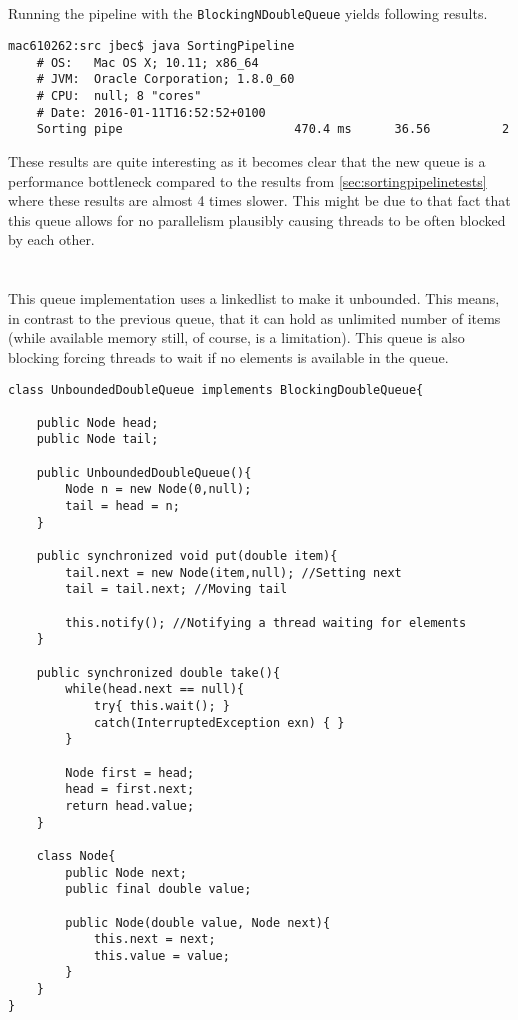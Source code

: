 \documentclass{ituhandin}
\begin{document}
\section{}
Running the pipeline with the \texttt{BlockingNDoubleQueue} yields following results.
\begin{lstlisting}[language={},frame={}]
    mac610262:src jbec$ java SortingPipeline
    # OS:   Mac OS X; 10.11; x86_64
    # JVM:  Oracle Corporation; 1.8.0_60
    # CPU:  null; 8 "cores"
    # Date: 2016-01-11T16:52:52+0100
    Sorting pipe                        470.4 ms      36.56          2
\end{lstlisting}
These results are quite interesting as it becomes clear that the new queue is a performance bottleneck compared to the results from \ref{sec:sortingpipelinetests} where these results are almost 4 times slower. This might be due to that fact that this queue allows for no parallelism plausibly causing threads to be often blocked by each other.

\chapter{} %
\section{}
This queue implementation uses a linkedlist to make it unbounded. This means, in contrast to the previous queue, that it can hold as unlimited number of items (while available memory still, of course, is a limitation). This queue is also blocking forcing threads to wait if no elements is available in the queue.
\begin{lstlisting}[caption= Implementation of the \texttt{UnboundedDoubleQueue} blocking queue]
class UnboundedDoubleQueue implements BlockingDoubleQueue{

    public Node head;
    public Node tail;

    public UnboundedDoubleQueue(){
        Node n = new Node(0,null);
        tail = head = n;
    }

    public synchronized void put(double item){
        tail.next = new Node(item,null); //Setting next
        tail = tail.next; //Moving tail

        this.notify(); //Notifying a thread waiting for elements
    }

    public synchronized double take(){
        while(head.next == null){
            try{ this.wait(); }
            catch(InterruptedException exn) { }
        }

        Node first = head;
        head = first.next;
        return head.value;
    }

    class Node{
        public Node next;
        public final double value;

        public Node(double value, Node next){
            this.next = next;
            this.value = value;
        }
    }
}
\end{lstlisting}
\end{document}

